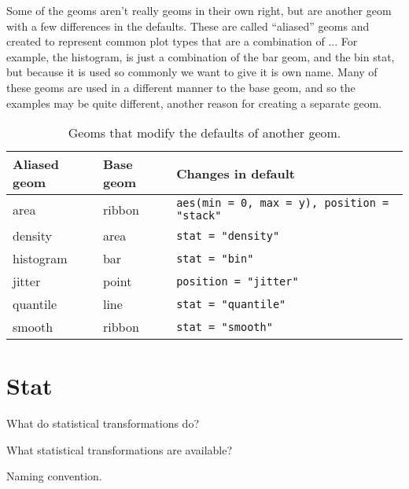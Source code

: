 Some of the geoms aren't really geoms in their own right, but are another geom with a few differences in the defaults.  These are called ``aliased'' geoms and created to represent common plot types that are a combination of ...  For example, the histogram, is just a combination of the bar geom, and the bin stat, but because it is used so commonly we want to give it is own name. Many of these geoms are used in a different manner to the base geom, and so the examples may be quite different, another reason for creating a separate geom.

\begin{table}
  \begin{center}
  \begin{tabular}{lll}
    \toprule
    Aliased geom & Base geom & Changes in default \\
    \midrule
    area      & ribbon & \verb!aes(min = 0, max = y), position = "stack"!  \\
    density   & area   & \verb!stat = "density"!    \\
    histogram & bar    & \verb!stat = "bin"!        \\
    jitter    & point  & \verb!position = "jitter"! \\
    quantile  & line   & \verb!stat = "quantile"!   \\
    smooth    & ribbon & \verb!stat = "smooth"!     \\
    \bottomrule
  \end{tabular}
  \end{center}
  \caption{Geoms that modify the defaults of another geom.}
  \label{label}
\end{table}

\section{Stat}
\label{sec:stat}

What do statistical transformations do?

What statistical transformations are available?

Naming convention.

